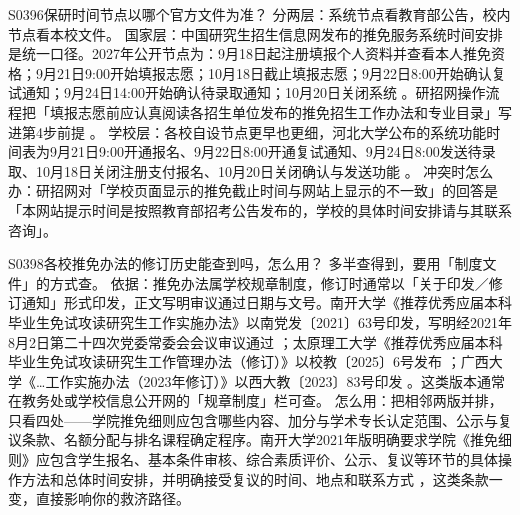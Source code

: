\begin{qa}{S0396}{保研时间节点以哪个官方文件为准？}
分两层：系统节点看教育部公告，校内节点看本校文件。
国家层：中国研究生招生信息网发布的推免服务系统时间安排是统一口径。2027年公开节点为：9月18日起注册填报个人资料并查看本人推免资格；9月21日9:00开始填报志愿；10月18日截止填报志愿；9月22日8:00开始确认复试通知；9月24日14:00开始确认待录取通知；10月20日关闭系统 。研招网操作流程把「填报志愿前应认真阅读各招生单位发布的推免招生工作办法和专业目录」写进第4步前提 。
学校层：各校自设节点更早也更细，河北大学公布的系统功能时间表为9月21日9:00开通报名、9月22日8:00开通复试通知、9月24日8:00发送待录取、10月18日关闭注册支付报名、10月20日关闭确认与发送功能 。
冲突时怎么办：研招网对「学校页面显示的推免截止时间与网站上显示的不一致」的回答是「本网站提示时间是按照教育部招考公告发布的，学校的具体时间安排请与其联系咨询」。
\end{qa}

\begin{qa}{S0398}{各校推免办法的修订历史能查到吗，怎么用？}
多半查得到，要用「制度文件」的方式查。
依据：推免办法属学校规章制度，修订时通常以「关于印发／修订通知」形式印发，正文写明审议通过日期与文号。南开大学《推荐优秀应届本科毕业生免试攻读研究生工作实施办法》以南党发〔2021〕63号印发，写明经2021年8月2日第二十四次党委常委会会议审议通过 ；太原理工大学《推荐优秀应届本科毕业生免试攻读研究生工作管理办法（修订）》以校教〔2025〕6号发布 ；广西大学《…工作实施办法（2023年修订）》以西大教〔2023〕83号印发 。这类版本通常在教务处或学校信息公开网的「规章制度」栏可查。
怎么用：把相邻两版并排，只看四处——学院推免细则应包含哪些内容、加分与学术专长认定范围、公示与复议条款、名额分配与排名课程确定程序。南开大学2021年版明确要求学院《推免细则》应包含学生报名、基本条件审核、综合素质评价、公示、复议等环节的具体操作方法和总体时间安排，并明确接受复议的时间、地点和联系方式 ，这类条款一变，直接影响你的救济路径。
\end{qa}

